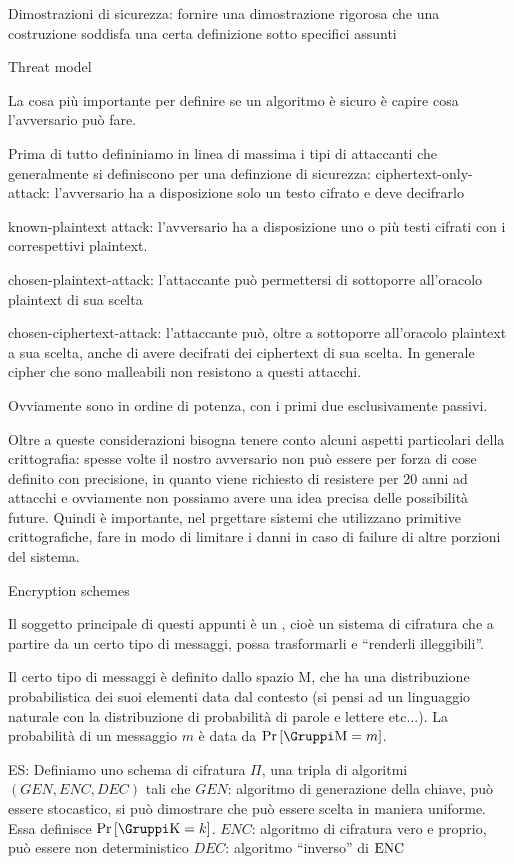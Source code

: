 \voce Dimostrazioni di sicurezza: fornire una dimostrazione rigorosa che una costruzione
soddisfa una certa definizione sotto specifici assunti

\sezione Threat model

La cosa pi\`u importante per definire se un algoritmo \`e sicuro \`e capire
cosa l'avversario pu\`o fare.

Prima di tutto defininiamo in linea di massima i tipi di attaccanti che
generalmente si definiscono per una definzione di sicurezza:
\smallskip
\voce ciphertext-only-attack: l'avversario ha a disposizione solo un testo cifrato
e deve decifrarlo

\voce known-plaintext attack: l'avversario ha a disposizione uno o pi\`u testi cifrati
con i correspettivi plaintext.

\voce chosen-plaintext-attack: l'attaccante pu\`o permettersi di sottoporre all'oracolo
plaintext di sua scelta

\voce chosen-ciphertext-attack: l'attaccante pu\`o, oltre a sottoporre all'oracolo
plaintext a sua scelta, anche di avere decifrati dei ciphertext di sua scelta.
In generale cipher che sono malleabili non resistono a questi attacchi.

Ovviamente sono in ordine di potenza, con i primi due esclusivamente passivi.

Oltre a queste considerazioni bisogna tenere conto alcuni aspetti particolari della crittografia:
spesse volte il nostro avversario non pu\`o essere per forza di cose definito con precisione,
in quanto viene richiesto di resistere per 20 anni ad attacchi e ovviamente non possiamo avere
una idea precisa delle possibilit\`a future. Quindi \`e importante, nel prgettare sistemi che
utilizzano primitive crittografiche, fare in modo di limitare i danni in caso di failure di
altre porzioni del sistema.

\sezione Encryption schemes

Il soggetto principale di questi appunti è un , cio\`e un sistema
di cifratura che a partire da un certo tipo di messaggi, possa trasformarli e ``renderli illeggibili''.

Il certo tipo di messaggi \`e definito dallo spazio \spazio M, che ha una distribuzione probabilistica
dei suoi elementi data dal contesto (si pensi ad un linguaggio naturale con la distribuzione di probabilit\`a
di parole e lettere etc...). La probabilit\`a di un messaggio $m$ \`e data da $\Pr[\gruppo M = m]$.

 ES: Definiamo uno schema di cifratura $\Pi$, una tripla di algoritmi $(GEN, ENC, DEC)$
tali che
\unorderedlist
\li $GEN$: algoritmo di generazione della chiave, pu\`o essere stocastico, si pu\`o dimostrare
che pu\`o essere scelta in maniera uniforme. Essa definisce $\Pr[\spazio K=k]$.
\li $ENC$: algoritmo di cifratura vero e proprio, pu\`o essere non deterministico
\li $DEC$: algoritmo ``inverso'' di $\hbox{ENC}$
\endunorderedlist

